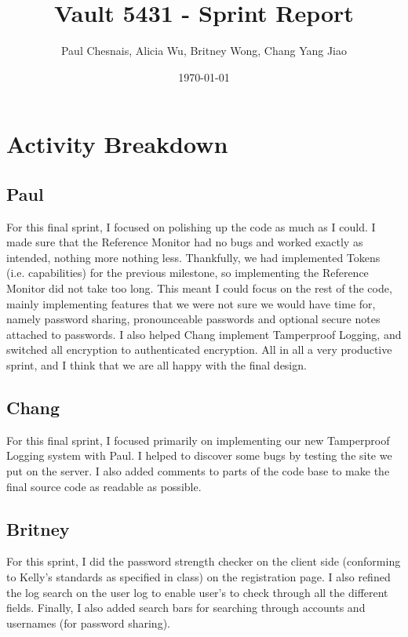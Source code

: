 \documentclass{article}
\title{Vault 5431 - Sprint Report}
\author{Paul Chesnais, Alicia Wu, Britney Wong, Chang Yang Jiao}
\date{\today}
\begin{document}
\maketitle
\thispagestyle{empty}

\section{Activity Breakdown}
\subsection{Paul}
\par For this final sprint, I focused on polishing up the code as much as I could. I made sure that the Reference Monitor had no bugs and worked exactly as intended, nothing more nothing less. Thankfully, we had implemented Tokens (i.e. capabilities) for the previous milestone, so implementing the Reference Monitor did not take too long. This meant I could focus on the rest of the code, mainly implementing features that we were not sure we would have time for, namely password sharing, pronounceable passwords and optional secure notes attached to passwords. I also helped Chang implement Tamperproof Logging, and switched all encryption to authenticated encryption. All in all a very productive sprint, and I think that we are all happy with the final design.

\subsection{Chang}
\par For this final sprint, I focused primarily on implementing our new Tamperproof Logging system with Paul. I helped to discover some bugs by testing the site we put on the server. I also added comments to parts of the code base to make the final source code as readable as possible.

\subsection{Britney}
\par For this sprint, I did the password strength checker on the client side (conforming to Kelly's standards as specified in class) on the registration page. I also refined the log search on the user log to enable user's to check through all the different fields. Finally, I also added search bars for searching through accounts and usernames (for password sharing).
\end{document}
